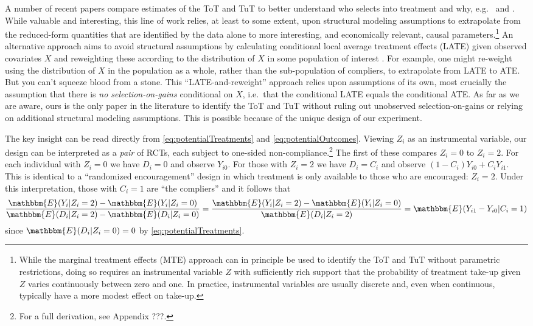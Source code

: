\documentclass[oneside,11pt]{article}
\begin{document}
A number of recent papers compare estimates of the ToT and TuT to better understand who selects into treatment and why, e.g.\ \cite{cornelissen2018benefits} and \cite{Walters}. While valuable and interesting, this line of work relies, at least to some extent, upon structural modeling assumptions to extrapolate from the reduced-form quantities that are identified by the data alone to more interesting, and economically relevant, causal parameters.\footnote{While the marginal treatment effects (MTE) approach \citep{heckman2007econometric} can in principle be used to identify the ToT and TuT without parametric restrictions, doing so requires an instrumental variable $Z$ with sufficiently rich support that the probability of treatment take-up given $Z$ varies continuously between zero and one. In practice, instrumental variables are usually discrete and, even when continuous, typically have a more modest effect on take-up.} An alternative approach aims to avoid structural assumptions by calculating conditional local average treatment effects (LATE) given observed covariates $X$ and reweighting these according to the distribution of $X$ in some population of interest \citep{aronow2013beyond,angrist2013extrapolate}. For example, one might re-weight using the distribution of $X$ in the population as a whole, rather than the sub-population of compliers, to extrapolate from LATE to ATE. But you can't squeeze blood from a stone. This ``LATE-and-reweight'' approach relies upon assumptions of its own, most crucially the assumption that there is \emph{no selection-on-gains} conditional on $X$, i.e.\ that the conditional LATE equals the conditional ATE. As far as we are aware, ours is the only paper in the literature to identify the ToT and TuT without ruling out unobserved selection-on-gains or relying on additional structural modeling assumptions. This is possible because of the unique design of our experiment.


The key insight can be read directly from \eqref{eq:potentialTreatments} and \eqref{eq:potentialOutcomes}. Viewing $Z_i$ as an instrumental variable, our design can be interpreted as a \emph{pair} of RCTs, each subject to one-sided non-compliance.\footnote{For a full derivation, see Appendix ???.} The first of these compares $Z_i=0$ to $Z_i = 2$. For each individual with $Z_i = 0$ we have $D_i = 0$ and observe $Y_{i0}$. For those with $Z_i = 2$ we have $D_i = C_i$ and observe $(1 - C_i) Y_{i0} + C_i Y_{i1}$. This is identical to a ``randomized encouragement'' design in which treatment is only available to those who are encouraged: $Z_i = 2$. Under this interpretation, those with $C_i = 1$ are ``the compliers'' and it follows that 
\begin{equation}
\frac{\mathbbm{E}(Y_i|Z_i=2) - \mathbbm{E}(Y_i|Z_i =0)}{\mathbbm{E}(D_i|Z_i=2)-\mathbbm{E}(D_i|Z_i=0)} = 
\frac{\mathbbm{E}(Y_i|Z_i=2) - \mathbbm{E}(Y_i|Z_i =0)}{\mathbbm{E}(D_i|Z_i=2)} = \mathbbm{E}(Y_{i1} - Y_{i0}|C_i = 1)
\label{eq:ToT}
\end{equation}
since $\mathbbm{E}(D_i|Z_i=0)=0$ by \eqref{eq:potentialTreatments}. 
\end{document}
